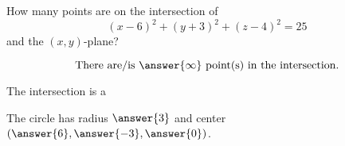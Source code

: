\documentclass{ximera}
\author{Bart Snapp}
\begin{document}
\begin{exercise}
  How many points are on the intersection of
  \[
  (x-6)^2 + (y+3)^2 + (z-4)^2 = 25
  \]
  and the $(x,y)$-plane?
  \begin{prompt}
  \[
  \text{There are/is $\answer{\infty}$ point(s) in the intersection.}
  \]
  \end{prompt}
  \begin{exercise}
    The intersection is a
    \begin{multipleChoice}
    \end{multipleChoice}
    \begin{exercise}
    The circle has radius $\answer{3}$ and center
    $(\answer{6},\answer{-3},\answer{0})$.
    \end{exercise}
  \end{exercise}
\end{exercise}
\end{document}
